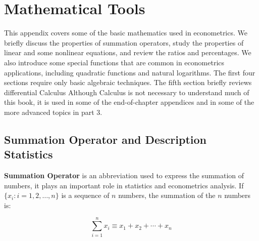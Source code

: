 \documentclass[11pt]{elegantbook}
\begin{document}
\nocite{en1,en2,en3}

\appendix

\chapter{Mathematical Tools}

This appendix covers some of the basic mathematics used in econometrics. We briefly discuss the properties of summation operators, study the properties of linear and some nonlinear equations, and review the ratios and percentages. We also introduce some special functions that are common in econometrics applications, including quadratic functions and natural logarithms. The first four sections require only basic algebraic techniques. The fifth section briefly reviews differential Calculus Although Calculus is not necessary to understand much of this book, it is used in some of the end-of-chapter appendices and in some of the more advanced topics in part 3.

\section{Summation Operator and Description Statistics}

\textbf{Summation Operator} is an abbreviation used to express the summation of numbers, it plays an important role in statistics and econometrics analysis. If $\{x_i: i=1, 2, \ldots, n\}$ is a sequence of $n$ numbers, the summation of the $n$ numbers is:

\begin{equation}
\sum_{i=1}^n x_i \equiv x_1 + x_2 +\cdots + x_n
\end{equation}
\end{document}
